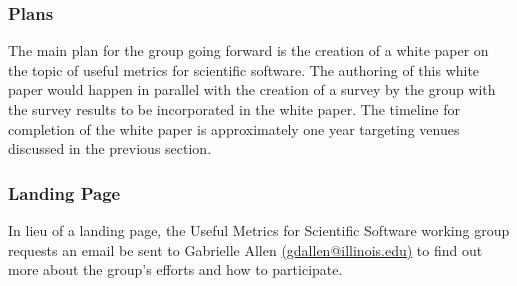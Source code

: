 \subsubsection{Plans}

The main plan for the group going forward is the creation of a white paper on
the topic of useful metrics for scientific software. The authoring of this white
paper would happen in parallel with the creation of a survey by the group with
the survey results to be incorporated in the white paper. The timeline for
completion of the white paper is approximately one year targeting venues
discussed in the previous section.

\subsubsection{Landing Page}

In lieu of a landing page, the Useful Metrics for Scientific Software working
group requests an email be sent to Gabrielle Allen
\href{mailto:gdallen@illinois.edu}{(gdallen@illinois.edu)} to find out more
about the group's efforts and how to participate.
